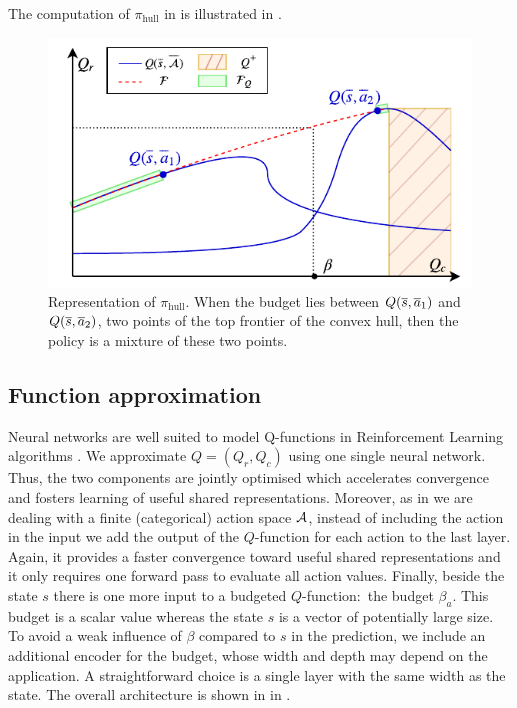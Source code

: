 \documentclass{article}
\begin{document}
The computation of $\pi_\text{hull}$ in  is illustrated in .

\begin{figure}
    \centering
    \includegraphics[width=\linewidth]{source/img/pi.pdf}
    \caption{Representation of $\pi_\text{hull}$. When the budget lies between $Q(\overline{s},\overline{a}_1)$ and $Q(\overline{s},\overline{a}_2)$, two points of the top frontier of the convex hull, then the policy is a mixture of these two points.}
    \label{fig:hull}
\end{figure}


\subsection{Function approximation}

Neural networks are well suited to model Q-functions in Reinforcement Learning algorithms \citep{Riedmiller2005,Mnih2015}.  We approximate $Q = (Q_r, Q_c)$ using one single neural network. Thus, the two components are jointly optimised which accelerates convergence and fosters learning of useful shared representations. Moreover, as in \citep{Mnih2015} we are dealing with a finite (categorical) action space $\mathcal{A}$, instead of including the action in the input we add the output of the $Q$-function for each action to the last layer. Again, it provides a faster convergence toward useful shared representations and it only requires one forward pass to evaluate all action values. Finally, beside the state $s$ there is one more input to a budgeted $Q$-function:~the budget $\beta_a$. This budget is a scalar value whereas the state $s$ is a vector of potentially large size. To avoid a weak influence of $\beta$ compared to $s$ in the prediction, we include an additional encoder for the budget, whose width and depth may depend on the application. A straightforward choice is a single layer with the same width as the state. The overall architecture is shown in  in .
\end{document}
